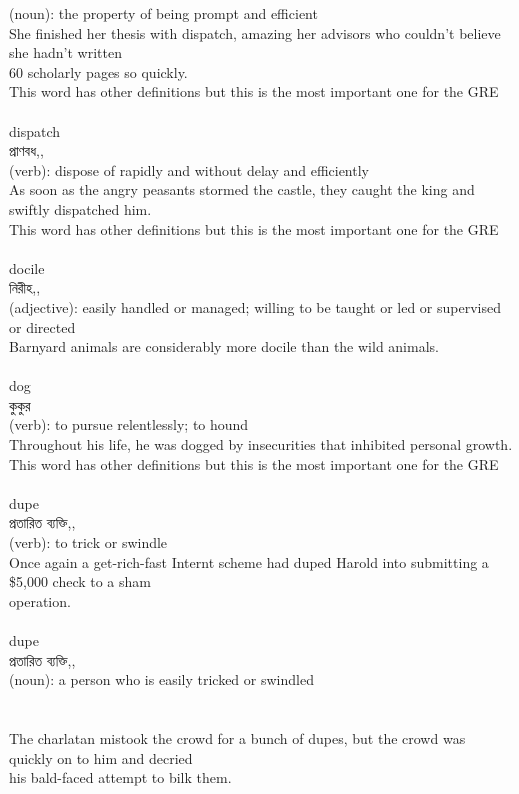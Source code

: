 \documentclass{article}
\begin{document}
{(noun): the property of being prompt and efficient\\She finished her thesis with dispatch, amazing her advisors who couldn't believe she hadn't written\\60 scholarly pages so quickly.\\This word has other definitions but this is the most important one for the GRE\\}\\
{dispatch}\\
{প্রাণবধ,,}\\
{(verb): dispose of rapidly and without delay and efficiently\\As soon as the angry peasants stormed the castle, they caught the king and swiftly dispatched him.\\This word has other definitions but this is the most important one for the GRE\\}\\
{docile}\\
{নিরীহ,,}\\
{(adjective): easily handled or managed; willing to be taught or led or supervised or directed\\Barnyard animals are considerably more docile than the wild animals.\\}\\
{dog}\\
{কুকুর}\\
{(verb): to pursue relentlessly; to hound\\Throughout his life, he was dogged by insecurities that inhibited personal growth.\\This word has other definitions but this is the most important one for the GRE\\}\\
{dupe}\\
{প্রতারিত ব্যক্তি,,}\\
{(verb): to trick or swindle\\Once again a get-rich-fast Internt scheme had duped Harold into submitting a \$5,000 check to a sham\\operation.\\}\\
{dupe}\\
{প্রতারিত ব্যক্তি,,}\\
{(noun): a person who is easily tricked or swindled\\\\                                                                                \\The charlatan mistook the crowd for a bunch of dupes, but the crowd was quickly on to him and decried\\his bald-faced attempt to bilk them.\\}\\
\end{document}
